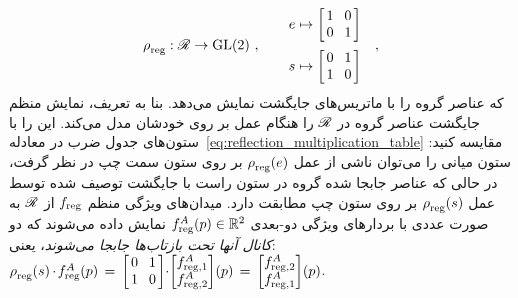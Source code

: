 \begin{align}
	\rho_{\overset{}{\textup{reg}}}: \mathscr{R} \to \operatorname{GL}(2)\ , \qquad 
	\begin{aligned}
		e &\mapsto
		\begin{bmatrix} \hspace{1.5pt}
			1 &\mkern-4mu 0 \hspace*{1.5pt} \\ \hspace{1.5pt} 0 &\mkern-4mu 1 \hspace*{1.5pt}
		\end{bmatrix} \\[2pt]
		s &\mapsto 
		\begin{bmatrix} \hspace{1.5pt}
			0 &\mkern-4mu 1 \hspace*{1.5pt} \\ \hspace{1.5pt} 1 &\mkern-4mu 0 \hspace*{1.5pt}
		\end{bmatrix}
	\end{aligned}
	\quad ,
\end{align}
که عناصر گروه را با ماتریس‌های جایگشت نمایش می‌دهد.
بنا به تعریف، نمایش منظم جایگشت عناصر گروه در $\mathscr{R}$ را هنگام عمل بر روی خودشان مدل می‌کند.
این را با ستون‌های جدول ضرب در معادله~\eqref{eq:reflection_multiplication_table} مقایسه کنید:
ستون میانی را می‌توان ناشی از عمل $\rho_{\overset{}{\textup{reg}}}(e)$ بر روی ستون سمت چپ در نظر گرفت، در حالی که عناصر جابجا شده گروه در ستون راست با جایگشت توصیف شده توسط عمل $\rho_{\overset{}{\textup{reg}}}(s)$ بر روی ستون چپ مطابقت دارد.
میدان‌های ویژگی منظم $f_{\textup{reg}}$ از $\mathscr{R}$ به صورت عددی با بردارهای ویژگی دو-بعدی $f^A_{\textup{reg}}(p) \in \mathbb{R}^2$ نمایش داده می‌شوند که دو \emph{کانال آنها تحت بازتاب‌ها جابجا می‌شوند}، یعنی:
$
\rho_{\overset{}{\textup{reg}}}(s) \mkern-1mu\cdot\mkern-2mu f^A_{\textup{reg}}(p)
\,=\,
\begin{bmatrix} \hspace{1.5pt} 0 &\mkern-4mu 1 \hspace*{1.5pt} \\ \hspace{1.5pt} 1 &\mkern-4mu 0 \hspace*{1.5pt} \end{bmatrix}
\mkern-4mu \cdot\mkern-4mu 
\begin{bmatrix} f^A_{\textup{reg},1} \\ f^A_{\textup{reg},2} \end{bmatrix} \!(p)
\,=\,
\begin{bmatrix} f^A_{\textup{reg},2} \\ f^A_{\textup{reg},1} \end{bmatrix} \!(p)
$.


